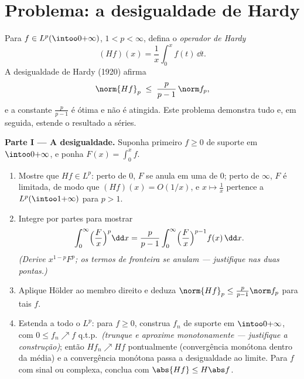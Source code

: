 \section{Problema: a desigualdade de Hardy}

\begin{problem}\label{pb:b3:lp:1}
Para $f \in L^p(\intoo0{+\infty})$, $1 < p < \infty$, defina o \emph{operador de Hardy}
\[
(Hf)(x) = \frac1x\int_0^x f(t)\,\dd t .
\]
A desigualdade de Hardy (1920) afirma
\[
\norm{Hf}_p \;\leq\; \frac{p}{p-1}\,\norm f_p ,
\]
e a constante $\frac p{p-1}$ é ótima e não é atingida. Este problema demonstra
tudo e, em seguida, estende o resultado a séries.

\medskip
\noindent\textbf{Parte I --- A desigualdade.} Suponha primeiro $f
\geq 0$
 de suporte  em $\intoo0{+\infty}$, e ponha $F(x) = \int_0^xf$.
\begin{enumerate}
  \item Mostre que $Hf \in L^p$: perto de $0$, $F$ se anula em uma
         de $0$; perto de $\infty$, $F$ é limitada,
        de modo que $(Hf)(x) = O(1/x)$, e $x \mapsto \frac1x$ pertence a $L^p(\intoo1{+\infty})$ para $p > 1$.
  \item Integre por partes para mostrar
        \[
        \int_0^\infty \Bigl(\frac Fx\Bigr)^p\dd x
        = \frac{p}{p-1}\int_0^\infty\Bigl(\frac
        Fx\Bigr)^{p-1}f(x)\,\dd x .
        \]
        \emph{(Derive $x^{1-p}F^p$; os termos de fronteira se anulam ---
        justifique nas duas pontas.)}
  \item Aplique Hölder ao membro direito e deduza $\norm{Hf}_p \leq \frac p{p-1}\norm f_p$ para tais
        $f$.
  \item Estenda a todo o $L^p$: para $f \geq 0$, construa $f_n$
         de suporte  em $\intoo0{+\infty}$, com $0 \leq f_n \nearrow f$ q.t.p.\
        \emph{(trunque e aproxime monotonamente --- justifique a
        construção)}; então $Hf_n \nearrow Hf$ pontualmente (convergência monótona
        dentro da média) e a convergência monótona passa a desigualdade
        ao limite. Para $f$ com sinal ou complexa, conclua com
        $\abs{Hf} \leq H\abs f$.
\end{enumerate}


\end{problem}
